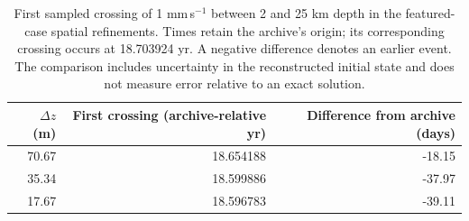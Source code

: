 \begin{table}[h]\centering\small
\begin{tabular}{rrr}\toprule
$\Delta z$ (m) & First crossing (archive-relative yr) & Difference from archive (days)\\\midrule
70.67 & 18.654188 & -18.15 \\
35.34 & 18.599886 & -37.97 \\
17.67 & 18.596783 & -39.11 \\
\bottomrule\end{tabular}
\caption{First sampled crossing of 1 mm\,s$^{-1}$ between 2 and 25 km depth in the featured-case spatial refinements. Times retain the archive's origin; its corresponding crossing occurs at 18.703924 yr. A negative difference denotes an earlier event. The comparison includes uncertainty in the reconstructed initial state and does not measure error relative to an exact solution.}
\end{table}
